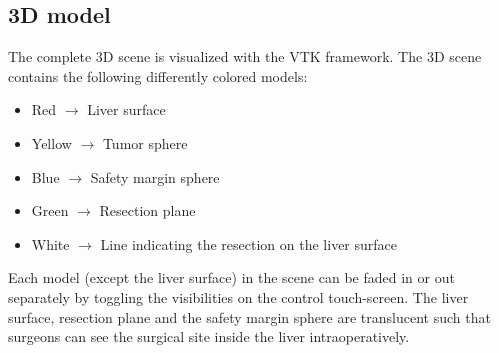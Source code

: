\subsection{3D model}
The complete 3D scene is visualized with the VTK framework. The 3D scene
contains the following differently colored models:
\begin{itemize}
  \item Red $\rightarrow$ Liver surface
  \item Yellow $\rightarrow$ Tumor sphere
  \item Blue $\rightarrow$ Safety margin sphere
  \item Green $\rightarrow$ Resection plane
  \item White $\rightarrow$ Line indicating the resection on the liver surface
\end{itemize}
Each model (except the liver surface) in the scene can be faded in or out
separately by toggling the visibilities on the control touch-screen.
The liver surface, resection plane and the safety margin sphere are translucent
such that surgeons can see the surgical site inside the liver intraoperatively.

